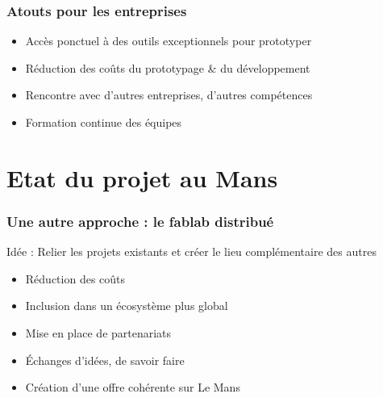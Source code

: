 \documentclass[10pt, compress]{beamer}
\begin{document}
	\begin{frame}
		\frametitle{Atouts pour les entreprises}

		\begin{itemize}
			\item Accès ponctuel à des outils exceptionnels pour \alert{prototyper}
			\item \alert{Réduction des coûts} du prototypage \& du développement
			\item Rencontre avec d'autres entreprises, d'\alert{autres compétences}
			\item \alert{Formation continue} des équipes
		\end{itemize}
	\end{frame}

	\section{Etat du projet au Mans}

	\begin{frame}
		\frametitle{Une autre approche : le fablab distribué}

		\begin{center}
			\alert{Idée :} Relier les projets existants et créer le lieu complémentaire des autres
		\end{center}

		\pause
		\begin{itemize}
			\item Réduction des coûts
			\item Inclusion dans un \alert{écosystème plus global}
			\item Mise en place de \alert{partenariats}
			\item \alert{Échanges d'idées}, de savoir faire
			\item Création d'une \alert{offre cohérente} sur Le Mans
		\end{itemize}
	\end{frame}
\end{document}
